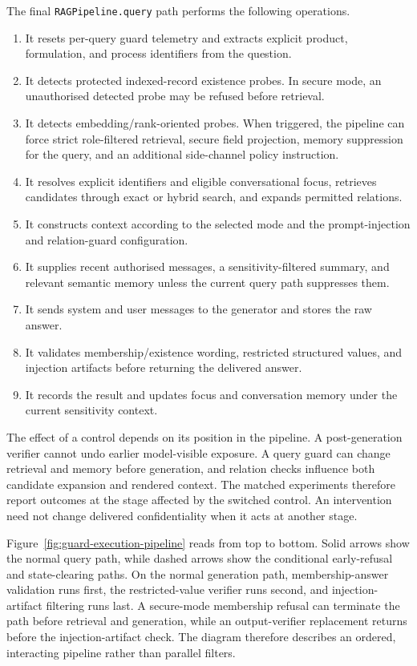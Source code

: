 The final \texttt{RAGPipeline.query} path performs the following operations.

\begin{enumerate}[leftmargin=*]
  \item It resets per-query guard telemetry and extracts explicit product, formulation, and process identifiers from the question.
  \item It detects protected indexed-record existence probes. In secure mode, an unauthorised detected probe may be refused before retrieval.
  \item It detects embedding/rank-oriented probes. When triggered, the pipeline can force strict role-filtered retrieval, secure field projection, memory suppression for the query, and an additional side-channel policy instruction.
  \item It resolves explicit identifiers and eligible conversational focus, retrieves candidates through exact or hybrid search, and expands permitted relations.
  \item It constructs context according to the selected mode and the prompt-injection and relation-guard configuration.
  \item It supplies recent authorised messages, a sensitivity-filtered summary, and relevant semantic memory unless the current query path suppresses them.
  \item It sends system and user messages to the generator and stores the raw answer.
  \item It validates membership/existence wording, restricted structured values, and injection artifacts before returning the delivered answer.
  \item It records the result and updates focus and conversation memory under the current sensitivity context.
\end{enumerate}

The effect of a control depends on its position in the pipeline. A post-generation verifier cannot undo earlier model-visible exposure. A query guard can change retrieval and memory before generation, and relation checks influence both candidate expansion and rendered context. The matched experiments therefore report outcomes at the stage affected by the switched control. An intervention need not change delivered confidentiality when it acts at another stage.

Figure~\ref{fig:guard-execution-pipeline} reads from top to bottom. Solid arrows show the normal query path, while dashed arrows show the conditional early-refusal and state-clearing paths. On the normal generation path, membership-answer validation runs first, the restricted-value verifier runs second, and injection-artifact filtering runs last. A secure-mode membership refusal can terminate the path before retrieval and generation, while an output-verifier replacement returns before the injection-artifact check. The diagram therefore describes an ordered, interacting pipeline rather than parallel filters.

